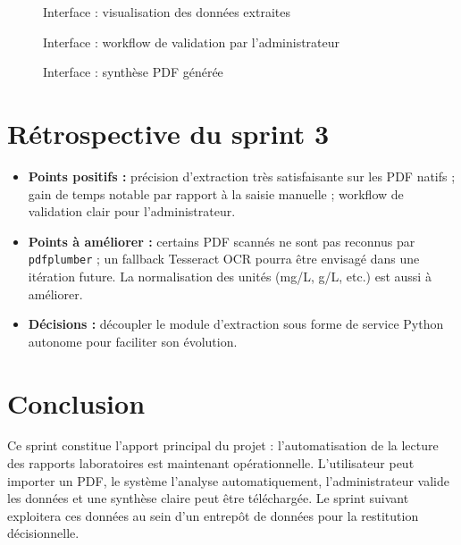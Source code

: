 \begin{figure}[h!]
\centering
{}
\caption{Interface : visualisation des données extraites}
\end{figure}

\begin{figure}[h!]
\centering
{}
\caption{Interface : workflow de validation par l'administrateur}
\end{figure}

\begin{figure}[h!]
\centering
{}
\caption{Interface : synthèse PDF générée}
\end{figure}

\section{Rétrospective du sprint 3}
\begin{itemize}
\item \textbf{Points positifs :} précision d'extraction très satisfaisante sur les
PDF natifs ; gain de temps notable par rapport à la saisie manuelle ; workflow de
validation clair pour l'administrateur.
\item \textbf{Points à améliorer :} certains PDF scannés ne sont pas reconnus par
\texttt{pdfplumber} ; un fallback Tesseract OCR pourra être envisagé dans une
itération future. La normalisation des unités (mg/L, g/L, etc.) est aussi à
améliorer.
\item \textbf{Décisions :} découpler le module d'extraction sous forme de service
Python autonome pour faciliter son évolution.
\end{itemize}

\section*{Conclusion}
Ce sprint constitue l'apport principal du projet : l'automatisation de la lecture
des rapports laboratoires est maintenant opérationnelle. L'utilisateur peut importer
un PDF, le système l'analyse automatiquement, l'administrateur valide les données et
une synthèse claire peut être téléchargée. Le sprint suivant exploitera ces données
au sein d'un entrepôt de données pour la restitution décisionnelle.


